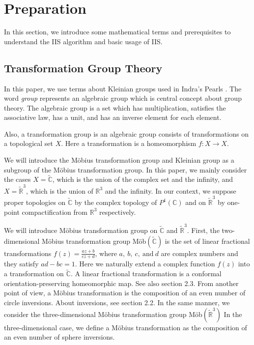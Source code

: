 
\section{Preparation}

In this section, we introduce some mathematical terms and prerequisites
to understand the IIS algorithm and basic usage of IIS.

\subsection{Transformation Group Theory}

In this paper, we use terms about Kleinian groups used in Indra's
Pearls \cite{MumfordSeriesWright200204}.
The word \textit{group} represents an algebraic group which is
central concept about group theory.
The algebraic group is a set which has multiplication, satisfies the
associative law, has a unit, and has an inverse element for each
element.

Also, a transformation group is an algebraic group consists of transformations 
on a topological set $X$.  Here a transformation is a homeomorphism
$f:X \to X$.

We will introduce the M\"obius transformation group and Kleinian group
as a subgroup of the M\"obius transformation group. 
In this paper, we mainly consider the cases $X=\tilde{\mathbb{C}}$,
which is the union of the complex set and the infinity, 
and $X=\tilde{ \mathbb{R} }^3$, which is the union of $\mathbb{R}^3$ and the infinity.
In our context, we suppose proper topologies on $\tilde{\mathbb{C}}$ 
by the complex topology of $P^1(\mathbb{C})$ and on $\tilde{ \mathbb{R} }^3$
by one-point compactification from $\mathbb{R}^3$ respectively.

We will introduce M\"obius transformation group on $\tilde{\mathbb{C}}$ and $\tilde{ \mathbb{R} }^3$.  
First, the two-dimensional M\"obius transformation group
\textrm{M\"ob}$(\tilde{\mathbb{C}})$ is the set of linear fractional transformations $f(z)=\frac{az+b}{cz+d}$, 
where $a,~b,~c,~\text{and}~d$ are complex numbers and they satisfy $ad-bc = 1$. Here we naturally extend a complex function $f(z)$ 
into a transformation on $\tilde{\mathbb{C}}$.  
A linear fractional transformation is a conformal orientation-preserving homeomorphic map.
See also section 2.3.
From another point of view, a M\"obius transformation is the composition
of an even number of circle inversions.  
About inversions, see section 2.2.
In the same manner, we consider the three-dimensional M\"obius
transformation group \textrm{M\"ob}$(\tilde{\mathbb{R}}^3)$
In the three-dimensional case, we define a M\"obius transformation as
the composition of an even number of sphere inversions.

